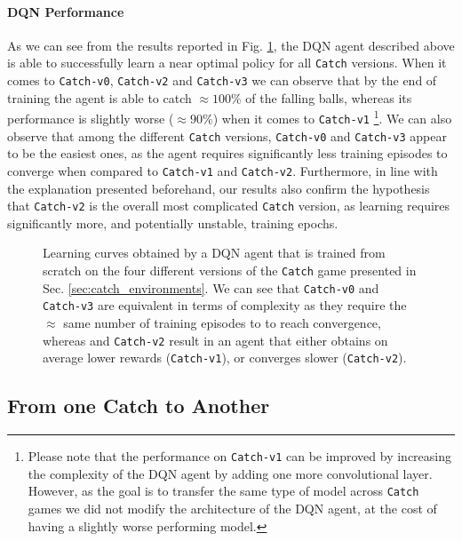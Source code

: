 \paragraph{DQN Performance}
As we can see from the results reported in Fig. \ref{fig:catch_baselines}, the DQN agent described above is able to successfully learn a near optimal policy for all \texttt{Catch} versions. When it comes to \texttt{Catch-v0}, \texttt{Catch-v2} and \texttt{Catch-v3} we can observe that by the end of training the agent is able to catch $\approx 100\%$ of the falling balls, whereas its performance is slightly worse ($\approx 90\%$) when it comes to \texttt{Catch-v1} \footnote{Please note that the performance on \texttt{Catch-v1} can be improved by increasing the complexity of the DQN agent by adding one more convolutional layer. However, as the goal is to transfer the same type of model across \texttt{Catch} games we did not modify the architecture of the DQN agent, at the cost of having a slightly worse performing model.}. We can also observe that among the different \texttt{Catch} versions, \texttt{Catch-v0} and \texttt{Catch-v3} appear to be the easiest ones, as the agent requires significantly less training episodes to converge when compared to \texttt{Catch-v1} and \texttt{Catch-v2}. Furthermore, in line with the explanation presented beforehand, our results also confirm the hypothesis that \texttt{Catch-v2} is the overall most complicated \texttt{Catch} version, as learning requires significantly more, and potentially unstable, training epochs.

\begin{figure}
\centering

\caption{Learning curves obtained by a DQN agent that is trained from scratch on the four different versions of the \texttt{Catch} game presented in Sec. \ref{sec:catch_environments}. We can see that \texttt{Catch-v0} and \texttt{Catch-v3} are equivalent in terms of complexity as they require the $\approx$ same number of training episodes to to reach convergence, whereas  and \texttt{Catch-v2} result in an agent that either obtains on average lower rewards (\texttt{Catch-v1}), or converges slower (\texttt{Catch-v2}).}
\label{fig:catch_baselines}
\end{figure}

\subsection{From one Catch to Another}
\label{sec:from_one_catch_to_another}

